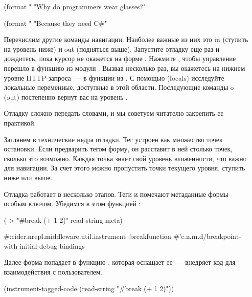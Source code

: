 \begin{english}
  \begin{clojure}
(format "%
  "Why do programmers wear glasses?"

(format "%
  "Because they need C#"
  \end{clojure}
\end{english}

Перечислим другие команды навигации. Наиболее важные из них это in (ступить на уровень ниже) и out (подняться выше). Запустите отладку еще раз и дождитесь, пока курсор не окажется на форме . Нажмите , чтобы управление перешло в функцию  из модуля . Вызвав  несколько раз, вы окажетесь на нижнем уровне HTTP-запроса~--- в функции  из . С помощью  (locals) исследуйте локальные переменные, доступные в этой области. Последующие команды o (out) постепенно вернут вас на уровень .

Отладку сложно передать словами, и мы советуем читателю закрепить ее практикой.

Заглянем в технические недра отладки. Тег  устроен как множество точек остановки. Если предварить тегом форму, он расставит в ней столько точек, сколько это возможно. Каждая точка знает свой уровень вложенности, что важно для навигации. За счет этого можно пропустить точки текущего уровня, ступить ниже или выше.

Отладка работает в несколько этапов. Теги  и  помечают метаданные формы особым ключом. Убедимся в этом функцией :

\begin{english}
  \begin{clojure}
(-> "#break (+ 1 2)"
    read-string
    meta)

#:cider.nrepl.middleware.util.instrument
{:breakfunction
 #'c.n.m.d/breakpoint-with-initial-debug-bindings}
  \end{clojure}
\end{english}

Далее форма попадает в функцию , которая оснащает ее~--- внедряет код для взаимодействия с пользователем.

\begin{english}
  \begin{clojure}
(instrument-tagged-code
 (read-string "#break (+ 1 2)"))
  \end{clojure}
\end{english}

